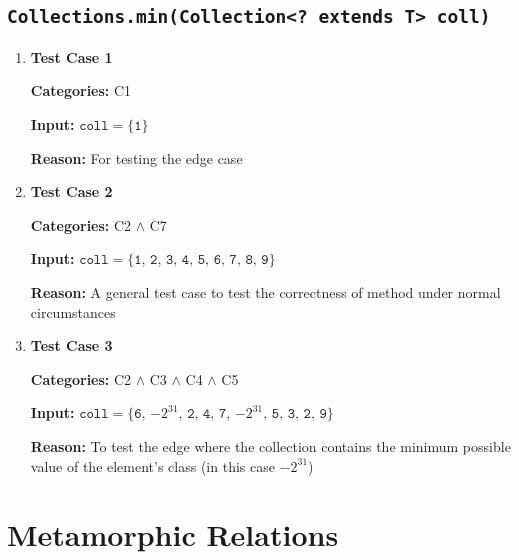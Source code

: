 \documentclass[12pt, a4paper]{article}
\begin{document}
\subsection{\texttt{Collections.min(Collection<? extends T> coll)}}
\begin{enumerate}
  \item \textbf{Test Case 1}
  \par\quad\textbf{Categories:} C1
  \par\quad\textbf{Input:} $\texttt{coll} = \{\texttt{1}\}$
  \par\quad\textbf{Reason:} For testing the edge case

  \item \textbf{Test Case 2}
  \par\quad\textbf{Categories:} C2 $\wedge$ C7
  \par\quad\textbf{Input:} $\texttt{coll} = \{\texttt{1, 2, 3, 4, 5, 6, 7, 8, 9}\}$

  \par\quad\textbf{Reason:} A general test case to test the correctness of method under normal
  circumstances

  \item \textbf{Test Case 3}
  \par\quad\textbf{Categories:} C2 $\wedge$ C3 $\wedge$ C4 $\wedge$ C5

  \par\quad\textbf{Input:} $\texttt{coll} = \{\texttt{6, $-2^{31}$, 2, 4, 7, $-2^{31}$, 5, 3, 2,
  9}\}$

  \par\quad\textbf{Reason:} To test the edge where the collection contains the minimum possible
  value of the element's class (in this case $-2^{31}$)
\end{enumerate}

\section{Metamorphic Relations}
\end{document}
